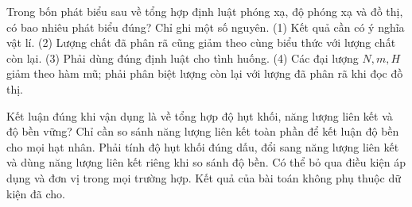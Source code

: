 \begin{ex}
Trong bốn phát biểu sau về tổng hợp định luật phóng xạ, độ phóng xạ và đồ thị, có bao nhiêu phát biểu đúng? Chỉ ghi một số nguyên. (1) Kết quả cần có ý nghĩa vật lí. (2) Lượng chất đã phân rã cũng giảm theo cùng biểu thức với lượng chất còn lại. (3) Phải dùng đúng định luật cho tình huống. (4) Các đại lượng $N,m,H$ giảm theo hàm mũ; phải phân biệt lượng còn lại với lượng đã phân rã khi đọc đồ thị.
\end{ex}

\begin{ex}
Kết luận đúng khi vận dụng là về tổng hợp độ hụt khối, năng lượng liên kết và độ bền vững?
\choice
{Chỉ cần so sánh năng lượng liên kết toàn phần để kết luận độ bền cho mọi hạt nhân.}
{\True Phải tính độ hụt khối đúng dấu, đổi sang năng lượng liên kết và dùng năng lượng liên kết riêng khi so sánh độ bền.}
{Có thể bỏ qua điều kiện áp dụng và đơn vị trong mọi trường hợp.}
{Kết quả của bài toán không phụ thuộc dữ kiện đã cho.}
\end{ex}

